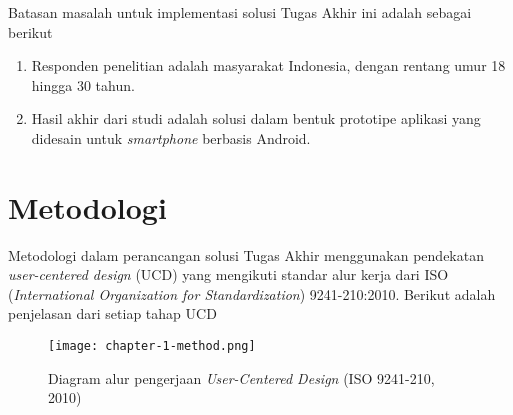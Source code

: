 Batasan masalah untuk implementasi solusi Tugas Akhir ini adalah sebagai berikut
\begin{enumerate}
  \item Responden penelitian adalah masyarakat Indonesia, dengan rentang umur 18 hingga 30 tahun.
  \item Hasil akhir dari studi adalah solusi dalam bentuk prototipe aplikasi yang didesain untuk \textit{smartphone} berbasis Android.
\end{enumerate}

\section{Metodologi}
\label{sec:metodologi}

Metodologi dalam perancangan solusi Tugas Akhir menggunakan pendekatan \textit{user-centered design} (UCD) yang mengikuti standar alur kerja dari ISO (\textit{International Organization for Standardization}) 9241-210:2010. Berikut adalah penjelasan dari setiap tahap UCD


\begin{figure}[h]
  \centering
  \texttt{[image: chapter-1-method.png]}
  \caption{Diagram alur pengerjaan \textit{User-Centered Design} (ISO 9241-210, 2010)}
  \label{fig:diagram_iso1}
\end{figure}

